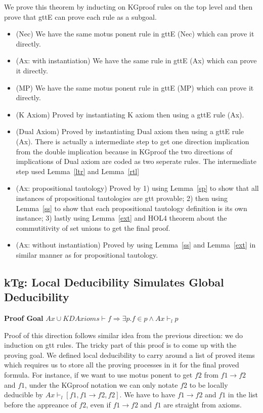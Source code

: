 \documentclass[submission,copyright,creativecommons]{eptcs}
\begin{document}
We prove this theorem by inducting on KGproof rules on the top level and 
then prove that gttE can prove each rule as a subgoal.
\begin{itemize}
  \item (Nec) We have the same motus ponent rule in gttE (Nec) which can prove it directly.
  \item (Ax: with instantiation) We have the same rule in gttE (Ax) which can prove it directly.
  
  \item (MP) We have the same motus ponent rule in gttE (MP) which can prove it directly.

  \item (K Axiom) Proved by instantiating K axiom then using a gttE rule (Ax). 
  
  \item (Dual Axiom) Proved by instantiating Dual axiom then using a gttE rule (Ax). 
  There is actually a intermediate step to get one direction implication from the 
  double implication because in KGproof the two directions of implications of Dual axiom 
  are coded as two seperate rules. The intermediate step used Lemma~\ref{ltr} and Lemma~\ref{rtl}
 
  \item (Ax: propositional tautology) Proved by 1) using Lemma~\ref{sp} to show that all  
  instances of propositional tautologies are gtt provable; 2) then using Lemma~\ref{ss}
  to show that each propositional tautology definition is its own instance; 3) lastly using 
  Lemma~\ref{ext} and HOL4 theorem about the commutitivity of set unions to 
  get the final proof.

  \item (Ax: without instantiation) Proved by using Lemma~\ref{ss} and Lemma~\ref{ext} in 
  similar manner as for propositional tautology.
 
 
\end{itemize}


\subsection{kTg: Local Deducibility Simulates Global Deducibility}
\textbf{Proof Goal} $Ax \cup KDAxioms \vdash f \Rightarrow \exists p. f \in p \wedge Ax \vdash_l p$


Proof of this direction follows similar idea from the previous 
direction: we do induction on gtt rules. The tricky 
part of this proof is to come up with the proving goal. 
We defined local deducibility to carry around a list of proved items which 
requires us to store all the proving processes in it for the final 
proved formula. For instance, if we want to use motus ponent to get 
$f2$ from $f1 \rightarrow f2$ and $f1$, under the KGproof notation 
we can only notate $f2$ to be locally deducible by $Ax \vdash_l [f1, f1\rightarrow f2, f2]$.
We have to have  $f1 \rightarrow f2$ and $f1$ in the list before the appreance of $f2$, even if 
$f1 \rightarrow f2$ and $f1$ are straight from axioms. 
\end{document}
